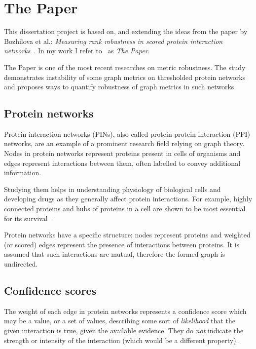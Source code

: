 \section{The Paper}

This dissertation project is based on, and extending the ideas from the paper by Bozhilova et al.: \textsl{Measuring rank robustness in scored protein interaction networks}~\cite{Bozhilova2019}.
In my work I refer to~\cite{Bozhilova2019} as \textsl{The Paper}.

The Paper is one of the most recent researches on metric robustness.
The study demonstrates instability of some graph metrics on thresholded protein networks and proposes ways to quantify robustness of graph metrics in such networks.

\subsection{Protein networks}

Protein interaction networks (PINs), also called protein-protein interaction (PPI) networks, are an example of a prominent research field relying on graph theory.
Nodes in protein networks represent proteins present in cells of organisms and edges represent interactions between them, often labelled to convey additional information.

Studying them helps in understanding physiology of biological cells and developing drugs as they generally affect protein interactions.
For example, highly connected proteins and hubs of proteins in a cell are shown to be most essential for its survival~\cite{JeongLethalityCentralityProtein2001,HeWhyHubsTend2006}.

Protein networks have a specific structure: nodes represent proteins and weighted (or scored) edges represent the presence of interactions between proteins.
It is assumed that such interactions are mutual, therefore the formed graph is undirected.



\subsection{Confidence scores}

The weight of each edge in protein networks represents a confidence score which may be a value, or a set of values, describing some sort of \textsl{likelihood} that the given interaction is true, given the available evidence.
They do \textsl{not} indicate the strength or intensity of the interaction (which would be a different property).

